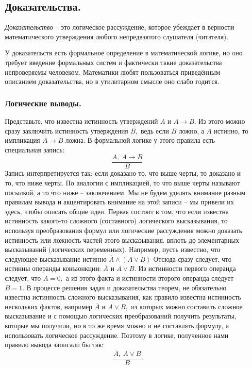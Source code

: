 \subsection{Доказательства.}

\begin{definition}
    \textit{Доказательство} -- это логическое рассуждение, которое убеждает в верности математического утверждения любого непредвзятого слушателя (читателя). 
\end{definition}

У доказательств есть формальное определение в математической логике, но оно требует введение формальных систем и фактически такие доказательства непроверяемы человеком. Математики любят пользоваться приведённым описанием доказательства, но в утилитарном смысле оно слабо годится.

\subsubsection{Логические выводы.}

Представьте, что известна истинность утверждений $A$ и $A \rightarrow B.$ Из этого можно сразу заключить истинность утверждения $B,$ ведь если $B$ ложно, а $A$ истинно, то импликация $A \rightarrow B$ ложна. В формальной логике у этого правила есть специальная запись:
$$\frac{A, \ A \rightarrow B}{B}$$
Запись интерпретируется так: если доказано то, что выше черты, то доказано и то, что ниже черты. По аналогии с импликацией, то что выше черты называют посылкой, а то что ниже -- заключением. Мы не будем уделять внимание разным правилам вывода и акцентировать внимание на этой записи -- мы привели их здесь, чтобы описать общие идеи.
Первая состоит в том, что если известна истинность какого-то сложного (составного) логического высказывания, то используя преобразования формул или логические рассуждения можно доказать истинность или ложность частей этого высказывания, вплоть до элементарных высказываний (логических переменных). Например, пусть известно, что следующее высказывание истинно
$\overline{A} \wedge (A \vee B) $
Отсюда сразу следует, что истинны операнды конъюнкции: $\overline{A}$ и $A \vee B.$ Из истинности первого операнда следует, что $A = 0,$ а из этого факта и истинности второго
операнда следует $B = 1.$ В процессе решения задач и доказательства теорем, не обязательно известна истинность сложного высказывания, как правило известна истинность нескольких фактов, например $\overline{A}$ и $A \vee B,$ из которых можно составить сложное высказывание и с помощью логических преобразований получить результаты, которые мы получили, но в то же время можно и не составлять формулу, а использовать логическое рассуждение. Поэтому в логике, полученное нами правило вывода записали бы так:
$$\frac{\overline{A}, \ A \vee B}{B}$$

